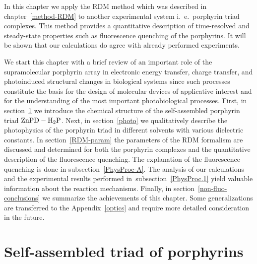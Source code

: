\documentclass[12pt,twoside,a4paper]{report}
\begin{document}
In this chapter we apply the RDM method which was 
described in chapter~\ref{method-RDM} 
to  another experimental system i.~e.~porphyrin  triad complexes. 
This method provides a {quantitative} description of 
time-resolved and steady-state properties such as fluorescence quenching 
of the 
porphyrins. It will be shown that our calculations do agree with already 
performed experiments. 
 
We start this chapter with a brief review of an important role of the 
supramolecular porphyrin array in electronic energy transfer, charge 
transfer, and photoinduced structural changes in biological systems since 
such processes constitute the basis for the design of molecular devices of 
applicative interest and for the understanding of the most important 
photobiological processes. 
First, in section~\ref{chem-struct} we introduce 
the chemical structure of the self-assembled porphyrin 
triad ${\rm ZnPD-H_2P }$. 
Next, in section~\ref{photo}  we {qualitatively describe the }
photophysics of the porphyrin 
triad  in different solvents with various dielectric 
constants. 
%
%
%
In section~\ref{RDM-param}
the  parameters of the RDM formalism  
are discussed and determined
for both  {the porphyrin complexes 
and} the {quantitative description of the fluorescence quenching. 
%
%
%
The explanation of 
the }fluorescence quenching is done in subsection~\ref{PhysProc-A}.
 The analysis of our calculations and the experimental results 
performed in~subsection~\ref{PhysProc.1}
yield valuable information about the reaction mechanisms.
Finally, in section~\ref{non-fluo-conclusions}
we summarize the achievements of this chapter. 
Some generalizations are 
transferred to the Appendix~\ref{optics} 
and require more detailed consideration in the 
future. 
 
\section{Self-assembled triad of porphyrins} \label{chem-struct}
\end{document}
